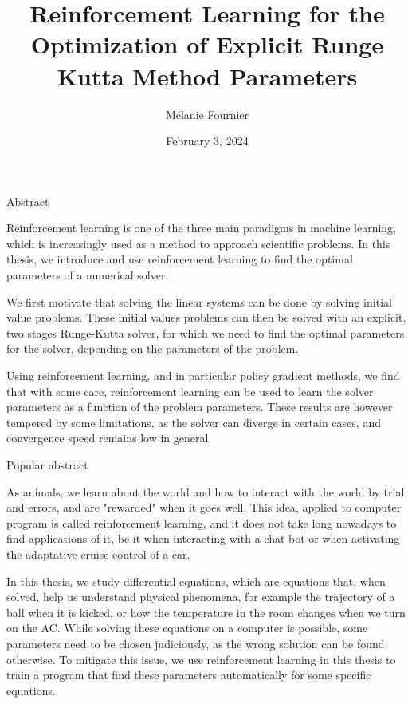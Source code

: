 \documentclass[
  letterpaper,
]{report}
\title{Reinforcement Learning for the Optimization of Explicit Runge
Kutta Method Parameters}
\author{Mélanie Fournier}
\date{February 3, 2024}
\theoremstyle{definition}
\theoremstyle{plain}
\theoremstyle{definition}
\theoremstyle{remark}
\begin{document}
\maketitle

\newpage


\begin{center}
\huge{Abstract}
\end{center}

\vspace*{\baselineskip}

Reinforcement learning is one of the three main paradigms in machine learning, which is increasingly used as a method to approach scientific problems. In this thesis, we introduce and use reinforcement learning to find the optimal parameters of a numerical solver.

We first motivate that solving the linear systems can be done by solving initial value problems. These initial values problems can then be solved with an explicit, two stages Runge-Kutta solver, for which we need to find the optimal parameters for the solver, depending on the parameters of the problem.   

Using reinforcement learning, and in particular policy gradient methods, we find that with some care, reinforcement learning can be used to learn the 
solver parameters as a function of the problem parameters. These results are however tempered by some limitations, as the solver can diverge in certain cases, and convergence speed remains low in general.

\vspace*{\baselineskip}

\begin{center}
\huge{Popular abstract}
\end{center}

\vspace*{\baselineskip}

As animals, we learn about the world and how to interact with the world by trial and errors, and are "rewarded" when it goes well. This idea, applied to computer program is called reinforcement learning, and it does not take long nowadays to find applications of it, be it when interacting with a chat bot or when activating the adaptative cruise control of a car.

In this thesis, we study differential equations, which are equations that, when solved, help us understand physical phenomena, for example the trajectory of a ball when it is kicked, or how the temperature in the room changes when we turn on the AC. While solving these equations on a computer is possible, some parameters need to be chosen judiciously, as the wrong solution can be found otherwise. To mitigate this issue, we use reinforcement learning in this thesis to train a program that find these parameters automatically for some specific equations.
\end{document}
